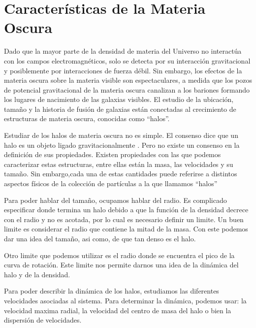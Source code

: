 \section{Características de la Materia Oscura}

Dado que la mayor parte de la densidad de materia del Universo no interactúa con los campos electromagnéticos, solo se detecta por su interacción gravitacional y posiblemente por interacciones de fuerza débil. Sin embargo, los efectos de la materia oscura sobre la materia visible son espectaculares, a medida que los pozos de potencial gravitacional de la materia oscura canalizan a los bariones formando los lugares de nacimiento de las galaxias visibles. El estudio de la ubicación, tamaño y la historia de fusión de galaxias están conectadas al crecimiento de estructuras de materia oscura, conocidas como ``halos''.

Estudiar de los halos de materia oscura no es simple.  El consenso dice que un halo es un objeto ligado gravitacionalmente \cite{2011MNRAS.415.2293K}. Pero no existe un consenso en la definición de sus propiedades. Existen propiedades con las que podemos caracterizar estas estructuras, entre ellas están la masa, las velocidades y su tamaño. Sin embargo,cada una de estas cantidades puede referirse a distintos aspectos físicos de la colección de partículas a la que llamamos ``halos''

Para poder hablar del tamaño, ocupamos hablar del radio. Es complicado especificar donde termina un halo debido a que la función de la densidad decrece con el radio y no es acotada, por lo cual es necesario definir un limite. Un buen limite es considerar el radio que contiene la mitad de la masa. Con este podemos dar una idea del tamaño, asi como, de que tan denso es el halo. 

Otro limite que podemos utilizar es el radio donde se encuentra el pico de la curva de rotación. Este limite nos permite darnos una idea de la dinámica del halo y de la densidad.

Para poder describir la dinámica de los halos, estudiamos las diferentes velocidades asociadas al sistema. Para determinar la dinámica, podemos usar: la velocidad maxima radial, la velocidad del centro de masa del halo o bien la dispersión de velocidades.

